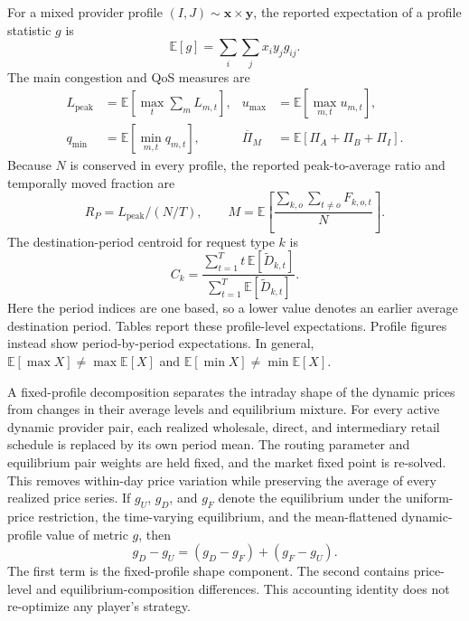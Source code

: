 \documentclass[11pt,a4paper]{article}
\begin{document}
For a mixed provider profile $(I,J)\sim\boldsymbol x\times\boldsymbol y$, the reported expectation of a profile statistic $g$ is
\begin{equation}
\mathbb E[g]=\sum_i\sum_j x_i y_j g_{ij}.
\label{eq:mixed_expectation}
\end{equation}
The main congestion and QoS measures are
\begin{align}
L_{\mathrm{peak}}&=\mathbb E\!\left[\max_t\sum_m L_{m,t}\right],
&u_{\max}&=\mathbb E\!\left[\max_{m,t}u_{m,t}\right],\label{eq:peak_metrics}\\
q_{\min}&=\mathbb E\!\left[\min_{m,t}q_{m,t}\right],
&\overline{\Pi}_M&=\mathbb E[\Pi_A+\Pi_B+\Pi_I].\label{eq:qos_profit_metrics}
\end{align}
Because $N$ is conserved in every profile, the reported peak-to-average ratio and temporally moved fraction are
\begin{equation}
R_P=L_{\mathrm{peak}}/(N/T),
\qquad
M=\mathbb E\!\left[\frac{\sum_{k,o}\sum_{t\ne o}F_{k,o,t}}{N}\right].
\label{eq:movement_metrics}
\end{equation}
The destination-period centroid for request type $k$ is
\begin{equation}
C_k=
\frac{\sum_{t=1}^{T}t\,\mathbb E[\widetilde D_{k,t}]}
{\sum_{t=1}^{T}\mathbb E[\widetilde D_{k,t}]}.
\label{eq:destination_centroid}
\end{equation}
Here the period indices are one based, so a lower value denotes an earlier average destination period.
Tables report these profile-level expectations. Profile figures instead show period-by-period expectations. In general, $\mathbb E[\max X]\ne\max\mathbb E[X]$ and $\mathbb E[\min X]\ne\min\mathbb E[X]$.

A fixed-profile decomposition separates the intraday shape of the dynamic prices from changes in their average levels and equilibrium mixture. For every active dynamic provider pair, each realized wholesale, direct, and intermediary retail schedule is replaced by its own period mean. The routing parameter and equilibrium pair weights are held fixed, and the market fixed point is re-solved. This removes within-day price variation while preserving the average of every realized price series. If $g_U$, $g_D$, and $g_F$ denote the equilibrium under the uniform-price restriction, the time-varying equilibrium, and the mean-flattened dynamic-profile value of metric $g$, then
\begin{equation}
g_D-g_U=(g_D-g_F)+(g_F-g_U).
\label{eq:price_shape_decomposition}
\end{equation}
The first term is the fixed-profile shape component. The second contains price-level and equilibrium-composition differences. This accounting identity does not re-optimize any player's strategy.
\end{document}
